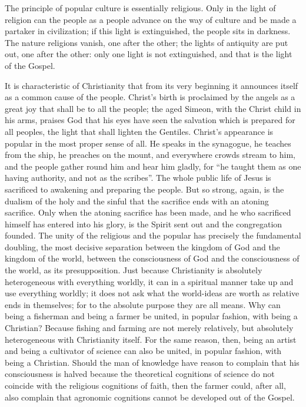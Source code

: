 \documentclass[12pt]{book}
\newcommand{\opage}[1]{\marginnote{\footnotesize\textit{[#1]}}}
\begin{document}
The principle of popular culture is essentially religious. Only in the
light of religion can the people as a people advance on the way of
culture and be made a partaker in civilization; if this light is
extinguished, the people sits in darkness. The nature religions vanish,
one after the other; the lights of antiquity are put out, one after the
other: only one light is not extinguished, and that is the light of the
Gospel.

It is characteristic of Christianity that from its very beginning it
announces itself as a common cause of the people. Christ's birth is
proclaimed by the angels as a great joy that shall be to all the people;
the aged Simeon, with the Christ child in his arms, praises God that his
eyes have seen the salvation which is prepared for all peoples, the
light that shall lighten the Gentiles. Christ's appearance is popular in
the most proper sense of all. He speaks in the synagogue, he teaches from
the ship, he preaches on the mount, and everywhere crowds stream to him,
and the people gather round him and hear him gladly, for ``he taught them
as one having authority, and not as the scribes''. The whole public life
of Jesus is sacrificed to awakening and preparing the people. But so
strong, again, is the dualism of the holy and the sinful that the
sacrifice ends with an atoning sacrifice. Only when the atoning
sacrifice has been made, and he who sacrificed himself has entered into
his glory, is the Spirit sent out and the congregation founded.
\opage{53}\setcounter{footnote}{0}%
The unity of the religious and the popular has precisely the fundamental
doubling, the most decisive separation between the kingdom of God and
the kingdom of the world, between the consciousness of God and the
consciousness of the world, as its presupposition. Just because
Christianity is absolutely heterogeneous with everything worldly, it can
in a spiritual manner take up and use everything worldly; it does not
ask what the world-ideas are worth as relative ends in themselves; for
to the absolute purpose they are all means. Why can being a fisherman
and being a farmer be united, in popular fashion, with being a
Christian? Because fishing and farming are not merely relatively, but
absolutely heterogeneous with Christianity itself. For the same reason,
then, being an artist and being a cultivator of science can also be
united, in popular fashion, with being a Christian. Should the man of
knowledge have reason to complain that his consciousness is halved
because the theoretical cognitions of science do not coincide with the
religious cognitions of faith, then the farmer could, after all, also
complain that agronomic cognitions cannot be developed out of the
Gospel.
\end{document}
